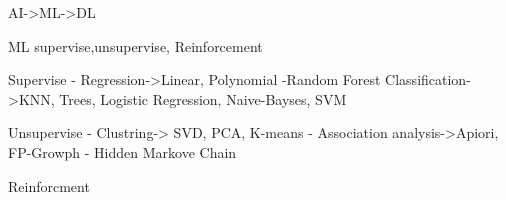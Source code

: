 AI->ML->DL

ML supervise,unsupervise, Reinforcement

Supervise
- Regression->Linear, Polynomial
-Random Forest
Classification->KNN, Trees, Logistic Regression, Naive-Bayses, SVM

Unsupervise
- Clustring-> SVD, PCA, K-means
- Association analysis->Apiori, FP-Growph
- Hidden Markove Chain

Reinforcment

